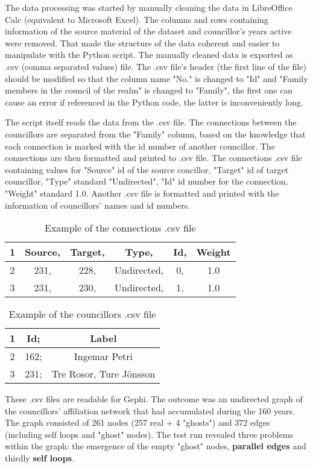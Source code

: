 The data processing was started by manually cleaning the data in LibreOffice Calc (equivalent to Microsoft Excel). The columns and rows containing information of the source material of the dataset and councillor's years active were removed. That made the structure of the data coherent and easier to manipulate with the Python script. The manually cleaned data is exported as .csv (comma separated values) file. The .csv file's header (the first line of the file) should be modified so that the column name "No." is changed to "Id" and "Family members in the council of the realm" is changed to "Family", the first one can cause an error if referenced in the Python code, the latter is inconveniently long.

The script itself reads the data from the .csv file. The connections between the councillors are separated from the "Family" column, based on the knowledge that each connection is marked with the id number of another councillor. The connections are then formatted and printed to .csv file. The connections .csv file containing values for "Source" id of the source concillor, "Target" id of target councillor, "Type" standard "Undirected", "Id" id number for the connection, "Weight" standard 1.0. Another .csv file is formatted and printed with the information of councillors' names and id numbers.

\begin{table}[h]
	\caption{Example of the connections .csv file}
	\centering
	\begin{tabular}{cccccc}
		\hline
		1 &Source, &Target, &Type, &Id, &Weight \\
		\hline
		2 &231, &228, &Undirected, &0, &1.0 \\
		\hline
		3 &231, &230, &Undirected, &1, &1.0 \\
		\hline
	\end{tabular}
\end{table}
\begin{table}[h]
	\caption{Example of the councillors .csv file}
	\centering
	\begin{tabular}{ccc}	
		\hline
		1 &Id; &Label \\
		\hline
		2 &162; &Ingemar Petri \\
		\hline
		3 &231; &Tre Rosor, Ture Jönsson \\
		\hline
	\end{tabular}
\end{table}

These .csv files are readable for Gephi. The outcome was an undirected graph of the councillors' affiliation network that had accumulated during the 160 years. The graph consisted of 261 nodes (257 real + 4 "ghosts") and 372 edges (including self loops and "ghost" nodes). The test run revealed three problems within the graph: the emergence of the empty "ghost" nodes, \textbf{parallel edges} and thirdly \textbf{self loops}. 

